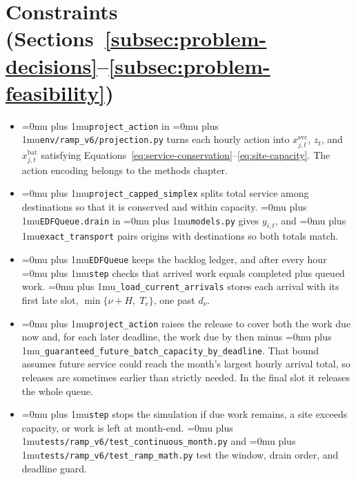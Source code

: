 \documentclass{UNCC-thesis}
\newcommand{\codepath}[1]{{\Urlmuskip=0mu plus 1mu\relax\nolinkurl{#1}}}
\begin{document}
\section{Constraints (Sections~\ref{subsec:problem-decisions}--\ref{subsec:problem-feasibility})}
\begin{itemize}
  \item \codepath{project_action} in \codepath{env/ramp_v6/projection.py}
        turns each hourly action into \(x^{\mathrm{svc}}_{j,t}\), \(z_t\), and
        \(x^{\mathrm{bat}}_{j,t}\) satisfying
        Equations~\eqref{eq:service-conservation}--\eqref{eq:site-capacity}.
        The action encoding belongs to the methods chapter.
  \item \codepath{project_capped_simplex} splits total service among
        destinations so that it is conserved and within capacity.
        \codepath{EDFQueue.drain} in \codepath{models.py} gives \(y_{i,t}\),
        and \codepath{exact_transport} pairs origins with destinations so both
        totals match.
  \item \codepath{EDFQueue} keeps the backlog ledger, and after every hour
        \codepath{step} checks that arrived work equals completed plus queued
        work. \codepath{_load_current_arrivals} stores each arrival with its
        first late slot, \(\min\{\nu+H,\;T_e\}\), one past \(d_\nu\).
  \item \codepath{project_action} raises the release to cover both the work due
        now and, for each later deadline, the work due by then minus
        \codepath{_guaranteed_future_batch_capacity_by_deadline}. That bound
        assumes future service could reach the month's largest hourly arrival
        total, so releases are sometimes earlier than strictly needed. In the
        final slot it releases the whole queue.
  \item \codepath{step} stops the simulation if due work remains, a site
        exceeds capacity, or work is left at month-end.
        \codepath{tests/ramp_v6/test_continuous_month.py} and
        \codepath{tests/ramp_v6/test_ramp_math.py} test the window, drain order,
        and deadline guard.
\end{itemize}
\end{document}
